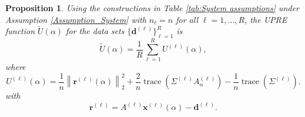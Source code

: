 \documentclass[12pt]{article}
\newcommand{\dVec}{\mathbf{d}}	%
\newcommand{\rVec}{\mathbf{r}}	%
\newcommand{\xVec}{\mathbf{x}}	%
\DeclareMathOperator{\trace}{trace}		%
\newcommand{\regparam}{\alpha}  %
\newcommand{\U}{U}	%
\newtheorem{proposition}{Proposition}[section]
\begin{document}
\begin{proposition}
Using the constructions in Table \ref{tab:System assumptions} under Assumption \ref{Assumption_System} with $n_\ell = n$ for all $\ell = 1,\ldots,R$, the UPRE function $\widetilde{U}(\regparam)$ for the data sets $\{\dVec^{(\ell)}\}_{\ell=1}^R$ is
\begin{equation}
\label{eq:Averaged UPRE}
\widetilde{\U}(\regparam) = \frac{1}{R} \sum_{\ell=1}^R \U^{(\ell)}(\regparam),
\end{equation}
where
\begin{equation}
\label{eq:Individual UPRE}
\U^{(\ell)}(\regparam) = \frac{1}{n}\left\|\rVec^{(\ell)}(\regparam)\right\|_2^2 + \frac{2}{n} \trace\left(\Sigma^{(\ell)} A_\regparam^{(\ell)}\right) - \frac{1}{n} \trace\left(\Sigma^{(\ell)}\right).
\end{equation}
with
\begin{equation}
\label{eq:Single Regularized Residual}
    \rVec^{(\ell)} = A^{(\ell)}\xVec^{(\ell)}(\regparam) - \dVec^{(\ell)}.
\end{equation}
\end{proposition}
\end{document}
